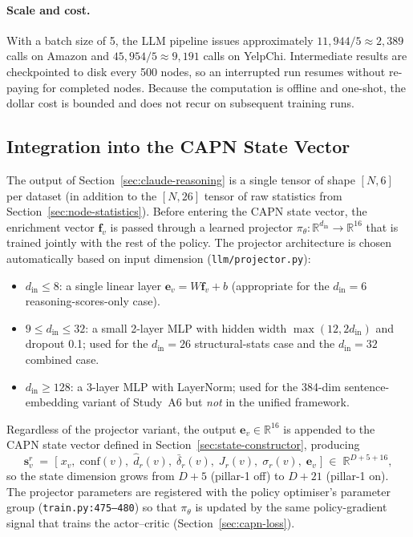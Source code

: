 \paragraph{Scale and cost.}
\label{sec:reliability-scale}
With a batch size of 5, the LLM pipeline issues approximately $11{,}944 / 5 \approx 2{,}389$ calls on Amazon and $45{,}954 / 5 \approx 9{,}191$ calls on YelpChi. Intermediate results are checkpointed to disk every 500 nodes, so an interrupted run resumes without re-paying for completed nodes. Because the computation is offline and one-shot, the dollar cost is bounded and does not recur on subsequent training runs.

\subsection{Integration into the CAPN State Vector}
\label{sec:llm-enrichment-integration}

The output of Section~\ref{sec:claude-reasoning} is a single tensor of shape $[N, 6]$ per dataset (in addition to the $[N, 26]$ tensor of raw statistics from Section~\ref{sec:node-statistics}). Before entering the CAPN state vector, the enrichment vector $\mathbf{f}_v$ is passed through a learned projector $\pi_\theta : \mathbb{R}^{d_{\text{in}}} \to \mathbb{R}^{16}$ that is trained jointly with the rest of the policy. The projector architecture is chosen automatically based on input dimension (\texttt{llm/projector.py}):

\begin{itemize}
    \item $d_{\text{in}} \leq 8$: a single linear layer $\mathbf{e}_v = W \mathbf{f}_v + b$ (appropriate for the $d_{\text{in}} = 6$ reasoning-scores-only case).
    \item $9 \leq d_{\text{in}} \leq 32$: a small 2-layer MLP with hidden width $\max(12, 2 d_{\text{in}})$ and dropout 0.1; used for the $d_{\text{in}} = 26$ structural-stats case and the $d_{\text{in}} = 32$ combined case.
    \item $d_{\text{in}} \geq 128$: a 3-layer MLP with LayerNorm; used for the 384-dim sentence-embedding variant of Study~A6 but \emph{not} in the unified framework.
\end{itemize}

Regardless of the projector variant, the output $\mathbf{e}_v \in \mathbb{R}^{16}$ is appended to the CAPN state vector defined in Section~\ref{sec:state-constructor}, producing
\begin{equation}
\mathbf{s}_v^{r} \;=\; \bigl[\; x_v,\; \mathrm{conf}(v),\; \hat{d}_r(v),\; \bar{\delta}_r(v),\; J_r(v),\; \sigma_r(v),\; \mathbf{e}_v \;\bigr]
\;\in\; \mathbb{R}^{D + 5 + 16},
\label{eq:state-with-llm}
\end{equation}
so the state dimension grows from $D + 5$ (pillar-1 off) to $D + 21$ (pillar-1 on). The projector parameters are registered with the policy optimiser's parameter group (\texttt{train.py:475--480}) so that $\pi_\theta$ is updated by the same policy-gradient signal that trains the actor--critic (Section~\ref{sec:capn-loss}).

